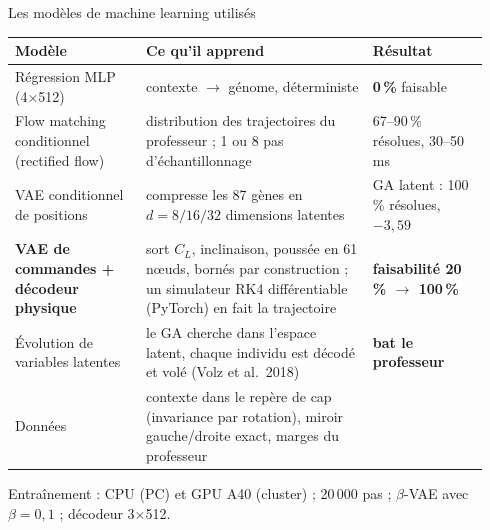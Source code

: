 \documentclass[aspectratio=169,10pt]{beamer}
\newcommand{\good}[1]{\textcolor{climb}{\textbf{#1}}}
\newcommand{\bad}[1]{\textcolor{sink}{\textbf{#1}}}
\newcommand{\fine}[1]{{\color{muted}\scriptsize #1}}
\begin{document}
\begin{frame}{Les modèles de machine learning utilisés}
  \footnotesize
  \begin{tabular}{@{}p{0.26\linewidth}p{0.45\linewidth}p{0.23\linewidth}@{}}
    \toprule
    Modèle & Ce qu'il apprend & Résultat \\ \midrule
    Régression MLP (4$\times$512) & contexte $\to$ génome, déterministe & \bad{0\,\%} faisable \\
    Flow matching conditionnel (rectified flow) & distribution des trajectoires du professeur ; 1 ou 8 pas d'échantillonnage & 67--90\,\% résolues, 30--50\,ms \\
    VAE conditionnel de positions & compresse les 87 gènes en $d=8/16/32$ dimensions latentes & GA latent : 100\,\% résolues, $-3{,}59$ \\
    \textbf{VAE de commandes + décodeur physique} & sort $C_L$, inclinaison, poussée en 61 n\oe uds, bornés par construction ; un simulateur RK4 différentiable (PyTorch) en fait la trajectoire & \good{faisabilité 20\,\% $\to$ 100\,\%} \\
    Évolution de variables latentes & le GA cherche dans l'espace latent, chaque individu est décodé et volé (Volz et al.~2018) & \good{bat le professeur} \\
    Données & contexte dans le repère de cap (invariance par rotation), miroir gauche/droite exact, marges du professeur & \\
    \bottomrule
  \end{tabular}\par\medskip
  \fine{Entraînement : CPU (PC) et GPU A40 (cluster) ; 20\,000 pas ; $\beta$-VAE avec $\beta=0{,}1$ ; décodeur 3$\times$512.}
\end{frame}
\end{document}
